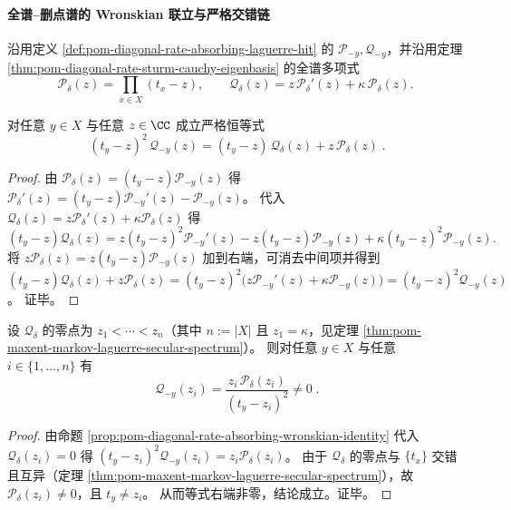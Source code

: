\paragraph{全谱--删点谱的 Wronskian 联立与严格交错链}
沿用定义 \ref{def:pom-diagonal-rate-absorbing-laguerre-hit} 的 \(\mathcal P_{-y},\mathcal Q_{-y}\)，并沿用定理 \ref{thm:pom-diagonal-rate-sturm-cauchy-eigenbasis} 的全谱多项式
\[
\mathcal P_\delta(z)=\prod_{x\in X}(t_x-z),
\qquad
\mathcal Q_\delta(z)=z\,\mathcal P_\delta'(z)+\kappa\,\mathcal P_\delta(z).
\]

\begin{proposition}\label{prop:pom-diagonal-rate-absorbing-wronskian-identity}
对任意 \(y\in X\) 与任意 \(z\in\CC\) 成立严格恒等式
\[
\boxed{\;
(t_y-z)^2\,\mathcal Q_{-y}(z)=(t_y-z)\,\mathcal Q_\delta(z)+z\,\mathcal P_\delta(z)\; } .
\]
\end{proposition}
\begin{proof}
由 \(\mathcal P_\delta(z)=(t_y-z)\mathcal P_{-y}(z)\) 得
\(
\mathcal P_\delta'(z)=(t_y-z)\mathcal P_{-y}'(z)-\mathcal P_{-y}(z)
\)。
代入 \(\mathcal Q_\delta(z)=z\mathcal P_\delta'(z)+\kappa\mathcal P_\delta(z)\) 得
\[
(t_y-z)\mathcal Q_\delta(z)
=z(t_y-z)^2\mathcal P_{-y}'(z)-z(t_y-z)\mathcal P_{-y}(z)+\kappa(t_y-z)^2\mathcal P_{-y}(z).
\]
将 \(z\mathcal P_\delta(z)=z(t_y-z)\mathcal P_{-y}(z)\) 加到右端，可消去中间项并得到
\(
(t_y-z)\mathcal Q_\delta(z)+z\mathcal P_\delta(z)=(t_y-z)^2\bigl(z\mathcal P_{-y}'(z)+\kappa\mathcal P_{-y}(z)\bigr)
=(t_y-z)^2\mathcal Q_{-y}(z)
\)。
证毕。
\end{proof}

\begin{corollary}[全谱零点处的删点值评估]\label{cor:pom-diagonal-rate-absorbing-deleted-eval-at-full-roots}
设 \(\mathcal Q_\delta\) 的零点为 \(z_1<\cdots<z_n\)（其中 \(n:=|X|\) 且 \(z_1=\kappa\)，见定理 \ref{thm:pom-maxent-markov-laguerre-secular-spectrum}）。
则对任意 \(y\in X\) 与任意 \(i\in\{1,\dots,n\}\) 有
\[
\boxed{\;
\mathcal Q_{-y}(z_i)=\frac{z_i\,\mathcal P_\delta(z_i)}{(t_y-z_i)^2}\ne 0\; } .
\]
\end{corollary}
\begin{proof}
由命题 \ref{prop:pom-diagonal-rate-absorbing-wronskian-identity} 代入 \(\mathcal Q_\delta(z_i)=0\) 得
\((t_y-z_i)^2\mathcal Q_{-y}(z_i)=z_i\mathcal P_\delta(z_i)\)。
由于 \(\mathcal Q_\delta\) 的零点与 \(\{t_x\}\) 交错且互异（定理 \ref{thm:pom-maxent-markov-laguerre-secular-spectrum}），故 \(\mathcal P_\delta(z_i)\ne 0\)，且 \(t_y\ne z_i\)。
从而等式右端非零，结论成立。证毕。
\end{proof}

